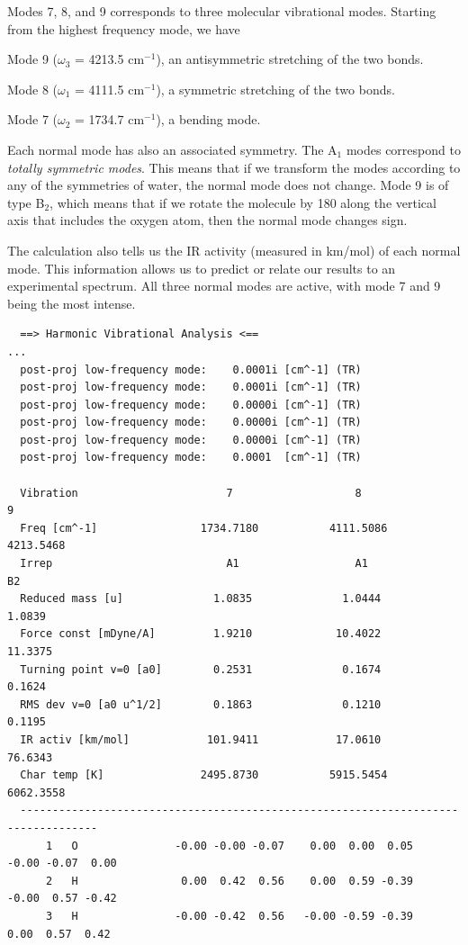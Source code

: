 \documentclass[../Main/chem371-notes.tex]{subfiles}
\begin{document}
Modes 7, 8, and 9 corresponds to three molecular vibrational modes.
Starting from the highest frequency mode, we have
\begin{myitems}
\item  Mode 9 ($\omega_3$ = 4213.5 cm$^{-1}$), an antisymmetric stretching of the two  bonds.
\item Mode 8 ($\omega_1$ = 4111.5 cm$^{-1}$), a symmetric stretching of the two  bonds.
\item Mode 7 ($\omega_2$ = 1734.7 cm$^{-1}$), a  bending mode. 
\end{myitems}
Each normal mode has also an associated symmetry. The A$_1$ modes correspond to \emph{totally symmetric modes}.
This means that if we transform the modes according to any of the symmetries of water, the normal mode does not change.
Mode 9 is of type B$_2$, which means that if we rotate the molecule by 180\textdegree{} along the vertical axis that includes the oxygen atom, then the normal mode changes sign.

The calculation also tells us the IR activity (measured in km/mol) of each normal mode. This information allows us to predict or relate our results to an experimental spectrum. All three normal modes are active, with mode 7 and 9 being the most intense.

\begin{small}
\begin{verbatim}
  ==> Harmonic Vibrational Analysis <==
...
  post-proj low-frequency mode:    0.0001i [cm^-1] (TR)
  post-proj low-frequency mode:    0.0001i [cm^-1] (TR)
  post-proj low-frequency mode:    0.0000i [cm^-1] (TR)
  post-proj low-frequency mode:    0.0000i [cm^-1] (TR)
  post-proj low-frequency mode:    0.0000i [cm^-1] (TR)
  post-proj low-frequency mode:    0.0001  [cm^-1] (TR)

  Vibration                       7                   8                   9           
  Freq [cm^-1]                1734.7180           4111.5086           4213.5468       
  Irrep                           A1                  A1                  B2          
  Reduced mass [u]              1.0835              1.0444              1.0839        
  Force const [mDyne/A]         1.9210             10.4022             11.3375        
  Turning point v=0 [a0]        0.2531              0.1674              0.1624        
  RMS dev v=0 [a0 u^1/2]        0.1863              0.1210              0.1195        
  IR activ [km/mol]            101.9411            17.0610             76.6343        
  Char temp [K]               2495.8730           5915.5454           6062.3558       
  ----------------------------------------------------------------------------------
      1   O               -0.00 -0.00 -0.07    0.00  0.00  0.05   -0.00 -0.07  0.00   
      2   H                0.00  0.42  0.56    0.00  0.59 -0.39   -0.00  0.57 -0.42   
      3   H               -0.00 -0.42  0.56   -0.00 -0.59 -0.39    0.00  0.57  0.42   
\end{verbatim}
\end{small}
\end{document}

